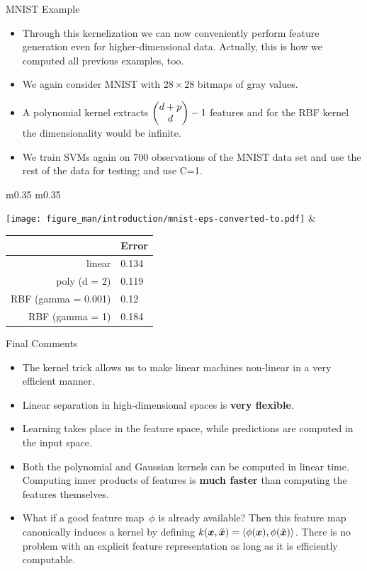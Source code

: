 \begin{vbframe}{MNIST Example}

    \begin{itemize}
      \item Through this kernelization we can now conveniently perform feature generation even
        for higher-dimensional data. Actually, this is how we computed all previous examples, too.
      \item We again consider MNIST with $28 \times 28$ bitmaps of gray values.
      \item A polynomial kernel extracts $\begin{pmatrix} d + p \\ d \end{pmatrix}-1$ features and for the RBF kernel the dimensionality would be infinite.
      \item We train SVMs again on 700 observations of the MNIST data set and use the rest of the data for testing; and use C=1.

    \end{itemize}

\begin{table}
\centering
\begin{tabular}{ m{} m{} }

\texttt{[image: figure\_man/introduction/mnist-eps-converted-to.pdf]} &
\begin{tabular}{r|l}
	& Error \\ 
	\hline
	linear & 0.134 \\ 
	poly (d = 2) & 0.119 \\ 
	RBF (gamma = 0.001) & 0.12 \\ 
	RBF (gamma = 1) & 0.184 \\ 
\end{tabular}
\end{tabular}
\end{table}


\end{vbframe}




\begin{vbframe}{Final Comments}

\begin{itemize}
\item The kernel trick allows us to make linear machines non-linear in a very
  efficient manner.
\item Linear separation in high-dimensional spaces is \textbf{very flexible}.

  \item Learning takes place in the feature space, while predictions are computed in the input space.
  \item Both the polynomial and Gaussian kernels can be computed in linear time. Computing inner products of features is \textbf{much faster} than computing the features themselves.
\item What if a good feature map~$\phi$ is already available?
Then this feature map canonically induces a kernel by
defining $k(\bm{x}, \tilde {\bm{x}}) = \left\langle \phi(\bm{x}), \phi(\tilde {\bm{x}}) \right\rangle$.
There is no problem with an explicit feature representation
as long as it is efficiently computable.
\end{itemize}
\end{vbframe}


\endlecture

